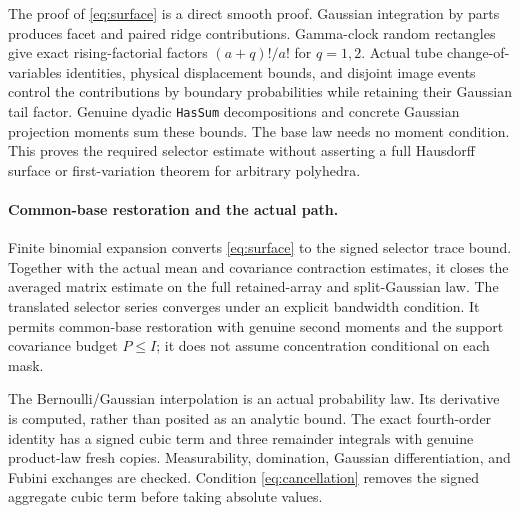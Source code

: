 \documentclass[11pt]{article}
\begin{document}
The proof of \eqref{eq:surface} is a direct smooth proof. Gaussian
integration by parts produces facet and paired ridge contributions.
Gamma-clock random rectangles give exact rising-factorial factors
$(a+q)!/a!$ for $q=1,2$. Actual tube change-of-variables identities,
physical displacement bounds, and disjoint image events control the
contributions by boundary probabilities while retaining their Gaussian
tail factor. Genuine dyadic \texttt{HasSum} decompositions and concrete
Gaussian projection moments sum these bounds. The base law needs no
moment condition. This proves the required selector estimate without
asserting a full Hausdorff surface or first-variation theorem for
arbitrary polyhedra.

\paragraph{Common-base restoration and the actual path.}
Finite binomial expansion converts \eqref{eq:surface} to the signed
selector trace bound. Together with the actual mean and covariance
contraction estimates, it closes the averaged matrix estimate on the
full retained-array and split-Gaussian law. The translated selector
series converges under an explicit bandwidth condition. It permits
common-base restoration with genuine second moments and the support
covariance budget $P\le I$; it does not assume concentration conditional
on each mask.

The Bernoulli/Gaussian interpolation is an actual probability law.
Its derivative is computed, rather than posited as an analytic bound.
The exact fourth-order identity has a signed cubic term and three
remainder integrals with genuine product-law fresh copies. Measurability,
domination, Gaussian differentiation, and Fubini exchanges are checked.
Condition \eqref{eq:cancellation} removes the signed aggregate cubic
term before taking absolute values.
\end{document}
